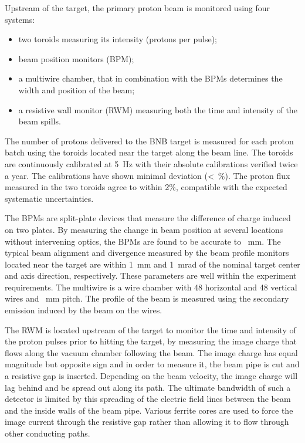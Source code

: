  Upstream of the target, the primary proton beam is monitored using four systems: %
 \begin{itemize}
   \item two toroids measuring its intensity (protons per pulse);
   \item beam position monitors (BPM);
   \item a multiwire chamber, that in combination with the BPMs determines the width and position of the beam;
   \item a resistive wall monitor (RWM) measuring both the time and intensity of the beam spills.
 \end{itemize}

 The number of protons delivered to the BNB target is measured for each proton %
 batch using the toroids located near the target along the beam line. 
 The toroids are continuously calibrated at 5~Hz with their absolute calibrations verified %
 twice a year.
 The calibrations have shown minimal deviation (< \,\%).
 The proton flux measured in the two toroids agree to within 2\%, compatible with the %
 expected systematic uncertainties.

 The BPMs are split-plate devices that measure the difference of charge induced on two plates. 
 By measuring the change in beam position at several locations without intervening optics, %
 the BPMs are found to be accurate to ~mm.
 The typical beam alignment and divergence measured by the beam profile monitors located %
 near the target are within 1~mm and 1~mrad of the nominal target center and axis direction, %
 respectively.
 These parameters are well within the experiment requirements. 
 The multiwire is a wire chamber with 48 horizontal and 48 vertical wires and ~mm pitch. 
 The profile of the beam is measured using the secondary emission induced by the beam on the wires.

 The RWM is located upstream of the target to monitor the time and intensity of the proton %
 pulses prior to hitting the target, by measuring the image charge that flows along the vacuum %
 chamber following the beam.
 The image charge has equal magnitude but opposite sign and in order to measure it, the beam pipe is cut %
 and a resistive gap is inserted. 
 Depending on the beam velocity, the image charge will lag behind and be spread out along its path. 
 The ultimate bandwidth of such a detector is limited by this spreading of %
 the electric field lines between the beam and the inside walls of the beam pipe.
 Various ferrite cores are used to force the image current through the resistive gap rather %
 than allowing it to flow through other conducting paths.
